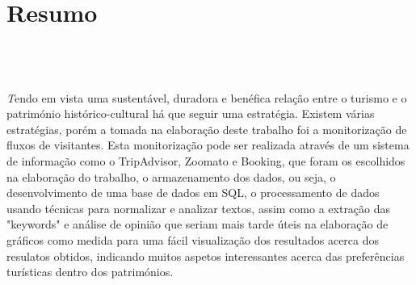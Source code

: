 \chapter{Resumo}
\section*{\textit{\TITULO}\\  {\small{\textit{\SUBTITULO}}}}


\textit
Tendo em vista uma sustentável, duradora e benéfica relação entre o turismo e o património histórico-cultural há que seguir uma estratégia. Existem várias estratégias, porém a tomada na elaboração deste trabalho foi a monitorização de fluxos de visitantes. Esta monitorização pode ser realizada através de um sistema de informação como o TripAdvisor, Zoomato e Booking, que foram os escolhidos na elaboração do trabalho, o armazenamento dos dados, ou seja, o desenvolvimento de uma base de dados em SQL, o processamento de dados usando técnicas para normalizar e analizar textos, assim como a extração das "keywords" e análise de opinião que seriam mais tarde úteis na elaboração de gráficos como medida para uma fácil visualização dos resultados acerca dos resulatos obtidos, indicando muitos aspetos interessantes acerca das preferências turísticas dentro dos patrimónios.
